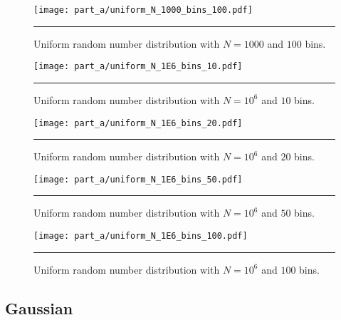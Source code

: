 \documentclass[notitlepage,aps,prd,nofootinbib]{revtex4-1}
\begin{document}
\begin{figure}[!htbc]
  \centering
  \texttt{[image: part\_a/uniform\_N\_1000\_bins\_100.pdf]}
	{\par\nobreak\rule[9pt]{35em}{0.5pt}\vspace{-5mm}}
	\caption{Uniform random number distribution with $N = 1000$ and $100$ bins.}
	\label{fig:uniform_N_1000_bins_100}
\end{figure}

\clearpage

\begin{figure}[!htbc]
  \centering
  \texttt{[image: part\_a/uniform\_N\_1E6\_bins\_10.pdf]}
	{\par\nobreak\rule[9pt]{35em}{0.5pt}\vspace{-5mm}}
	\caption{Uniform random number distribution with $N = 10^6$ and $10$ bins.}
	\label{fig:uniform_N_1E6_bins_10}
\end{figure}

\begin{figure}[!htbc]
  \centering
  \texttt{[image: part\_a/uniform\_N\_1E6\_bins\_20.pdf]}
	{\par\nobreak\rule[9pt]{35em}{0.5pt}\vspace{-5mm}}
	\caption{Uniform random number distribution with $N = 10^6$ and $20$ bins.}
	\label{fig:uniform_N_1E6_bins_20}
\end{figure}

\begin{figure}[!htbc]
  \centering
  \texttt{[image: part\_a/uniform\_N\_1E6\_bins\_50.pdf]}
	{\par\nobreak\rule[9pt]{35em}{0.5pt}\vspace{-5mm}}
	\caption{Uniform random number distribution with $N = 10^6$ and $50$ bins.}
	\label{fig:uniform_N_1E6_bins_50}
\end{figure}

\begin{figure}[!htbc]
  \centering
  \texttt{[image: part\_a/uniform\_N\_1E6\_bins\_100.pdf]}
	{\par\nobreak\rule[9pt]{35em}{0.5pt}\vspace{-5mm}}
	\caption{Uniform random number distribution with $N = 10^6$ and $100$ bins.}
	\label{fig:uniform_N_1E6_bins_100}
\end{figure}



\clearpage
\subsection{Gaussian}
\label{subsec:gaussian_results}
\end{document}
